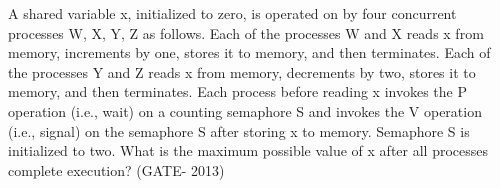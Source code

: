 \begin{minipage}{\linewidth}
\begin{parts}
  \end{parts}

  \end{minipage}

\vspace{0.08in}


\begin{minipage}{\linewidth}

  \question  A shared variable x, initialized to zero, is operated on by four concurrent processes W, X, Y, Z as follows.
            Each of the processes W and X reads x from memory, increments by one, stores it to memory, and then terminates.
            Each of the processes Y and Z reads x from memory, decrements by two, stores it to memory, and then terminates.
            Each process before reading x invokes the P operation (i.e., wait) on a counting semaphore S and
            invokes the V operation (i.e., signal) on the semaphore S after storing x to memory.
            Semaphore S is initialized to two. What is the maximum possible value of x after all
            processes complete execution? (GATE- 2013)

  \begin{oneparchoices}
  \end{oneparchoices}

  \end{minipage}

\vspace{0.08in}


